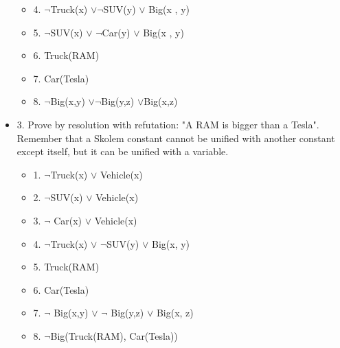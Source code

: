 \documentclass{article}
\begin{document}
\begin{itemize}
\begin{itemize}
    \item 4.	$\neg$Truck(x) $\vee$$\neg$SUV(y) $\vee$ Big(x , y)
    \item 5.	$\neg$SUV(x) $\vee$ $\neg$Car(y) $\vee$ Big(x , y)
    \item 6.	Truck(RAM)
    \item 7.	Car(Tesla)
    \item 8.	$\neg$Big(x,y) $\vee$$\neg$Big(y,z) $\vee$Big(x,z)
\end{itemize}
\item 3.    Prove by resolution with refutation: "A RAM is bigger than a Tesla". Remember that a Skolem constant cannot be unified with another constant except itself, but it can be unified with a variable.
\begin{itemize}
    \item 1.	$\neg$Truck(x) $\vee$ Vehicle(x)
    \item 2.	$\neg$SUV(x) $\vee$ Vehicle(x)
    \item 3.	$\neg$ Car(x) $\vee$ Vehicle(x)
    \item 4.	$\neg$Truck(x) $\vee$ $\neg$SUV(y) $\vee$ Big(x, y)
    \item 5.	Truck(RAM)
    \item 6.	Car(Tesla)
    \item 7.	$\neg$ Big(x,y) $\vee$ $\neg$ Big(y,z) $\vee$ Big(x, z)
    \item 8.	$\neg$Big(Truck(RAM), Car(Tesla))
\end{itemize}
\end{itemize}
\end{document}

